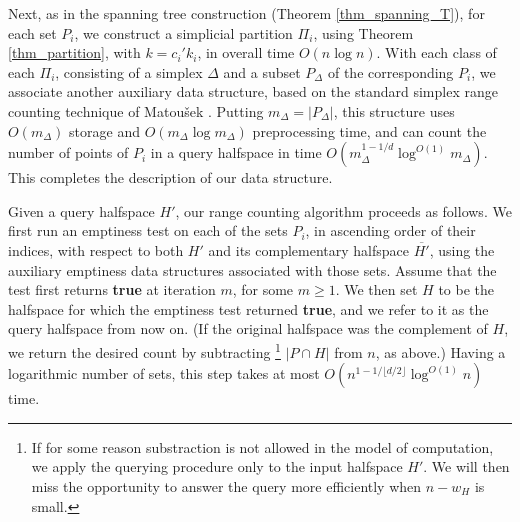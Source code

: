 \documentclass[11pt]{article}
\def\ol#1{\overline{#1}}
\begin{document}
Next, as in the spanning tree construction (Theorem \ref{thm_spanning_T}), for each set $P_{i}$, we construct a simplicial partition $\Pi_{i}$, using Theorem \ref{thm_partition}, with $k = c_{i}'k_{i}$, in overall time $O(n \log n)$. With each class of each $\Pi_{i}$, consisting of a simplex $\Delta$ and a subset $P_{\Delta}$ of the corresponding $P_{i}$, we associate another auxiliary data structure, based on the standard simplex range counting technique of Matou\v{s}ek \cite{mat92a}. Putting $m_{\Delta} = |P_{\Delta}|$, this structure uses $O(m_{\Delta})$ storage and $O(m_{\Delta} \log m_{\Delta})$ preprocessing time, and can count the number of points of $P_{i}$ in a query halfspace in time $O(m_{\Delta}^{1-1/d}\log^{O(1)}m_{\Delta})$. This completes the description of our data structure.


 Given a query halfspace $H'$, our range counting algorithm proceeds as follows. We first run an emptiness test on each of the sets $P_{i}$, in ascending order of their indices, with respect to both $H'$ and its complementary halfspace $\ol{H'}$, using the auxiliary emptiness data structures associated with those sets. Assume that the test first returns {\bf true} at iteration $m$, for some $m \geq 1$. We then set $H$ to be the halfspace for which the emptiness test returned {\bf true}, and we refer to it as the query halfspace from now on. (If the original halfspace was the complement of $H$, we return the desired count by subtracting \footnote{If for some reason substraction is not allowed in the model of computation, we apply the querying procedure only to the input halfspace $H'$. We will then miss the opportunity to answer the query more efficiently when $n - w_{H}$ is small.} $|P \cap H|$ from $n$, as above.) Having a logarithmic number of sets, this step takes at most $O(n^{1-1/\lfloor d/2 \rfloor} \log^{O(1)}n)$ time.
\end{document}
